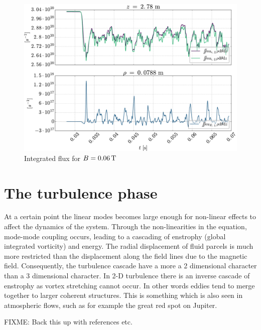 %
\begin{figure}[htb]
    \centering
    \includegraphics[width=1.00\textwidth]{fig/results/totalFlux/flux0006}
    \caption{Integrated flux for $B=0.06\, \text{T}$}
    \label{fig:flux0006}
\end{figure}

\section{The turbulence phase}
%
At a certain point the linear modes becomes large enough for non-linear effects to affect the dynamics of the system.
Through the non-linearities in the equation, mode-mode coupling occurs, leading to a cascading of enstrophy (global integrated vorticity) and energy.
The radial displacement of fluid parcels is much more restricted than the displacement along the field lines due to the magnetic field.
Consequently, the turbulence cascade have a more a 2 dimensional character than a 3 dimensional character.
In 2-D turbulence there is an inverse cascade of enstrophy as vortex stretching cannot occur.
In other words eddies tend to merge together to larger coherent structures.
This is something which is also seen in atmospheric flows, such as for example the great red spot on Jupiter.

FIXME: Back this up with references etc.

